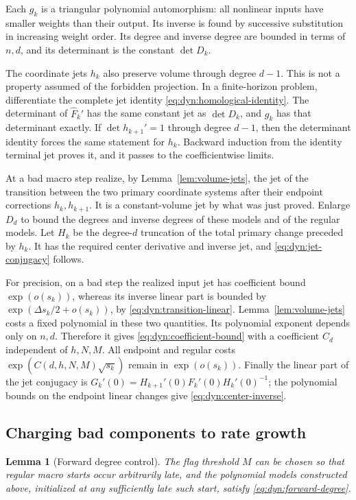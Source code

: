 \documentclass[11pt]{article}
\newtheorem{lemma}[theorem]{Lemma}
\theoremstyle{definition}
\theoremstyle{remark}
\numberwithin{equation}{section}
\begin{document}
Each $g_k$ is a triangular polynomial automorphism: all nonlinear
inputs have smaller weights than their output.  Its inverse is found
by successive substitution in increasing weight order.  Its degree
and inverse degree are bounded in terms of $n,d$, and its determinant
is the constant $\det D_k$.

The coordinate jets $h_k$ also preserve volume through degree $d-1$.
This is not a property assumed of the forbidden projection.  In a
finite-horizon problem, differentiate the complete jet identity
\eqref{eq:dyn:homological-identity}.  The determinant of
$\widehat F_k'$ has the same constant jet as $\det D_k$, and $g_k$ has
that determinant exactly.  If $\det h_{k+1}'=1$ through degree $d-1$,
then the determinant identity forces the same statement for $h_k$.
Backward induction from the identity terminal jet proves it, and it
passes to the coefficientwise limits.

At a bad macro step realize, by Lemma~\ref{lem:volume-jets}, the jet of
the transition between the two primary coordinate systems after their
endpoint corrections $h_k,h_{k+1}$.  It is a constant-volume jet by
what was just proved.  Enlarge $D_d$ to bound the degrees and inverse
degrees of these models and of the regular models.
Let $H_k$ be the degree-$d$ truncation of the total primary change
preceded by $h_k$.  It has the required center derivative and inverse
jet, and \eqref{eq:dyn:jet-conjugacy} follows.

For precision, on a bad step the realized input jet has coefficient
bound $\exp(o(s_k))$, whereas its inverse linear part is bounded by
$\exp(\Delta s_k/2+o(s_k))$, by
\eqref{eq:dyn:transition-linear}.  Lemma~\ref{lem:volume-jets} costs a
fixed polynomial in these two quantities.  Its polynomial exponent
depends only on $n,d$.  Therefore it gives
\eqref{eq:dyn:coefficient-bound} with a coefficient $C_d$ independent
of $h,N,M$.  All endpoint and regular costs
$\exp(C(d,h,N,M)\sqrt{s_k})$ remain in $\exp(o(s_k))$.
Finally the linear part of the jet conjugacy is
$G_k'(0)=H_{k+1}'(0)F_k'(0)H_k'(0)^{-1}$; the polynomial bounds on the
endpoint linear changes give \eqref{eq:dyn:center-inverse}.

\subsection{Charging bad components to rate growth}

\begin{lemma}[Forward degree control]\label{lem:degree-control}
The flag threshold $M$ can be chosen so that regular macro starts
occur arbitrarily late, and the polynomial models constructed above,
initialized at any sufficiently late such start, satisfy
\eqref{eq:dyn:forward-degree}.
\end{lemma}
\end{document}
